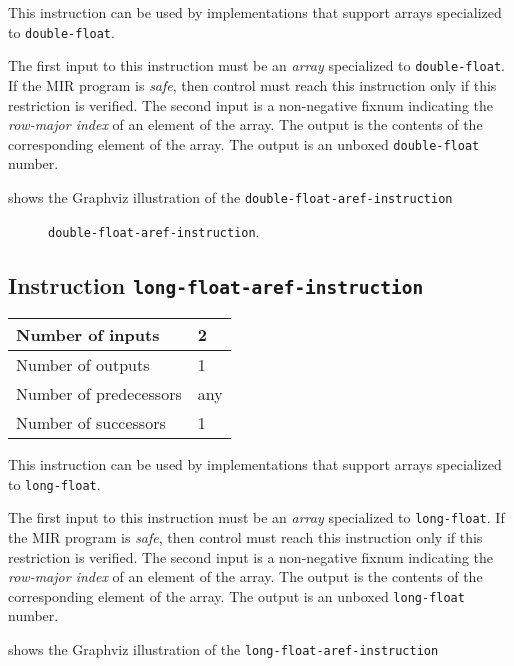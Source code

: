 This instruction can be used by implementations that support arrays
specialized to \texttt{double-float}.

The first input to this instruction must be an \emph{array}
specialized to \texttt{double-float}.  If the MIR program is
\emph{safe}, then control must reach this instruction only if this
restriction is verified.  The second input is a non-negative fixnum
indicating the \emph{row-major index} of an element of the array.  The
output is the contents of the corresponding element of the array.  The
output is an unboxed \texttt{double-float} number.

 shows the Graphviz illustration of the
\texttt{double-float-aref-instruction}

\begin{figure}
\begin{center}
\end{center}
\caption{\label{fig-double-float-aref-instruction}
\texttt{double-float-aref-instruction}.}
\end{figure}

\subsection{Instruction \texttt{long-float-aref-instruction}}
\label{mir-instruction-long-float-aref}

\begin{tabular}{|l|l|}
\hline
Number of inputs & 2\\
\hline
Number of outputs & 1\\
\hline
Number of predecessors & any\\
\hline
Number of successors & 1\\
\hline
\end{tabular}

This instruction can be used by implementations that support arrays
specialized to \texttt{long-float}.

The first input to this instruction must be an \emph{array}
specialized to \texttt{long-float}.  If the MIR program is
\emph{safe}, then control must reach this instruction only if this
restriction is verified.  The second input is a non-negative fixnum
indicating the \emph{row-major index} of an element of the array.  The
output is the contents of the corresponding element of the array.  The
output is an unboxed \texttt{long-float} number.

 shows the Graphviz illustration of the
\texttt{long-float-aref-instruction}

